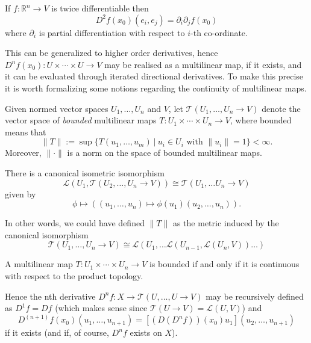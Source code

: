 \documentclass[twoside, a4paper, 10pt]{amsart}
\begin{document}
\begin{lemma}\label{lemma: second derivative is iterated derivative} If $f: \mathbb{R}^n \to V$ is twice differentiable then $$ D^2 f (x_0) (e_i, e_j) = \partial_i \partial_j f(x_0)$$ where $\partial_i$ is partial differentiation with respect to $i$-th co-ordinate. \end{lemma}

This can be generalized to higher order derivatives, hence $D^n f(x_0) : U \times \cdots \times U \to V$ may be realised as a multilinear map, if it exists, and it can be evaluated through iterated directional derivatives. To make this precise it is worth formalizing some notions regarding the continuity of multilinear maps.

\begin{mydef} Given normed vector spaces $U_1, \ldots, U_n$ and $V$, let $\mathcal{T}(U_1, \ldots, U_n \to V)$ denote the vector space of \textit{bounded} multilinear maps $T: U_1 \times \cdots \times U_n \to V$, where bounded means that $$\| T \| := \sup \{ T(u_1, \ldots, u_m) ~|~ u_i \in U_i \text{ with } \|u_i \| = 1 \} < \infty.$$ Moreover, $\| \cdot \|$ is a norm on the space of bounded multilinear maps.  \end{mydef}

\begin{prop} There is a canonical isometric isomorphism $$ \mathcal{L}(U_1, \mathcal{T}(U_2, \ldots, U_n \to V)) \cong \mathcal{T}(U_1, \ldots U_n \to V)$$ given by $$\phi \mapsto ((u_1, \ldots, u_n) \mapsto \phi(u_1)(u_2, \ldots, u_n)).$$  \end{prop}

In other words, we could have defined $\| T \|$ as the metric induced by the canonical isomorphism $$ \mathcal{T}(U_1, \ldots, U_n \to V) \cong  \mathcal{L}(U_1, \ldots \mathcal{L}(U_{n-1}, \mathcal{L}(U_n,V)) \ldots) $$

\begin{prop} A multilinear map $T: U_1 \times \cdots \times U_n \to V$ is bounded if and only if it is continuous with respect to the product topology. \end{prop}

Hence the nth derivative $D^nf : X \to \mathcal{T}(U, \ldots, U \to V)$ may be recursively defined as $D^1f = Df$ (which makes sense since $\mathcal{T}(U \to V) = \mathcal{L}(U, V)$) and $$D^{(n+1)}f (x_0)(u_1, \ldots, u_{n+1}) = [(D(D^nf))(x_0)u_1] (u_2, \ldots, u_{n+1})$$ if it exists (and if, of course, $D^nf$ exists on $X$). 
\end{document}
